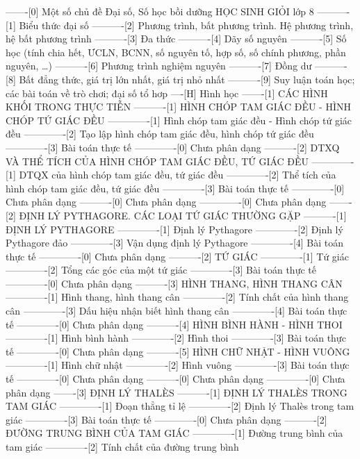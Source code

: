 -------[0] Một số chủ đề Đại số, Số học bồi dưỡng HỌC SINH GIỎI lớp 8
----------[1] Biểu thức đại số
----------[2] Phương trình, bất phương trình. Hệ phương trình, hệ bất phương trình
----------[3] Đa thức
----------[4] Dãy số nguyên
----------[5] Số học (tính chia hết, ƯCLN, BCNN, số nguyên tố, hợp số, số chính phương, phần nguyên, \ldots)
----------[6] Phương trình nghiệm nguyên
----------[7] Đồng dư
----------[8] Bất đẳng thức, giá trị lớn nhất, giá trị nhỏ nhất
----------[9] Suy luận toán học; các bài toán về trò chơi; đại số tổ hơp
----[H] Hình học
-------[1] CÁC HÌNH KHỐI TRONG THỰC TIỄN
----------[1] HÌNH CHÓP TAM GIÁC ĐỀU - HÌNH CHÓP TỨ GIÁC ĐỀU
-------------[1] Hình chóp tam giác đều - Hình chóp tứ giác đều
-------------[2] Tạo lập hình chóp tam giác đều, hình chóp tứ giác đều
-------------[3] Bài toán thực tế
-------------[0] Chưa phân dạng
----------[2] DTXQ VÀ THỂ TÍCH CỦA HÌNH CHÓP TAM GIÁC ĐỀU, TỨ GIÁC ĐỀU
-------------[1] DTQX của hình chóp tam giác đều, tứ giác đều
-------------[2] Thể tích của hình chóp tam giác đều, tứ giác đều
-------------[3] Bài toán thực tế
-------------[0] Chưa phân dạng
----------[0] Chưa phân dạng
-------------[0] Chưa phân dạng
-------[2] ĐỊNH LÝ PYTHAGORE. CÁC LOẠI TỨ GIÁC THƯỜNG GẶP
----------[1] ĐỊNH LÝ PYTHAGORE
-------------[1] Định lý Pythagore
-------------[2] Định lý Pythagore đảo
-------------[3] Vận dụng định lý Pythagore
-------------[4] Bài toán thực tế
-------------[0] Chưa phân dạng
----------[2] TỨ GIÁC
-------------[1] Tứ giác
-------------[2] Tổng các góc của một tứ giác
-------------[3] Bài toán thực tế
-------------[0] Chưa phân dạng
----------[3] HÌNH THANG, HÌNH THANG CÂN
-------------[1] Hình thang, hình thang cân
-------------[2] Tính chất của hình thang cân
-------------[3] Dấu hiệu nhận biết hình thang cân
-------------[4] Bài toán thực tế
-------------[0] Chưa phân dạng
----------[4] HÌNH BÌNH HÀNH - HÌNH THOI
-------------[1] Hình bình hành
-------------[2] Hình thoi
-------------[3] Bài toán thực tế
-------------[0] Chưa phân dạng
----------[5] HÌNH CHỮ NHẬT - HÌNH VUÔNG
-------------[1] Hình chữ nhật
-------------[2] Hình vuông
-------------[3] Bài toán thực tế
-------------[0] Chưa phân dạng
----------[0] Chưa phân dạng
-------------[0] Chưa phân dạng
-------[3] ĐỊNH LÝ THALÈS
----------[1] ĐỊNH LÝ THALÈS TRONG TAM GIÁC
-------------[1] Đoạn thẳng tỉ lệ
-------------[2] Định lý Thalès trong tam giác
-------------[3] Bài toán thực tế
-------------[0] Chưa phân dạng
----------[2] ĐƯỜNG TRUNG BÌNH CỦA TAM GIÁC
-------------[1] Đường trung bình của tam giác
-------------[2] Tính chất của đường trung bình
